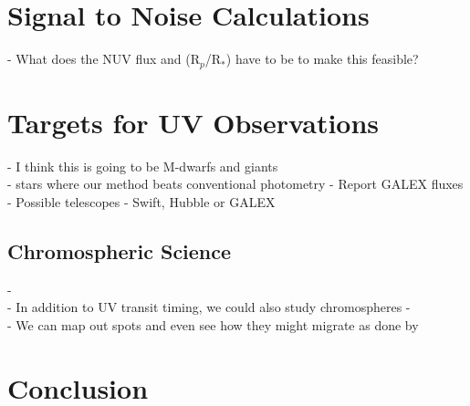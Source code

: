 \documentclass[manuscript]{aastex}
\begin{document}
\section{Signal to Noise Calculations} \label{labl:sn}
- What does the NUV flux and (R$_p$/R$_*$) have to be to make this feasible?

\section{Targets for UV Observations} \label{labl:targ}
- I think this is going to be M-dwarfs and giants \\
- stars where our method beats conventional photometry
-      Report GALEX fluxes \\
-   Possible telescopes - Swift, Hubble or GALEX \\

\subsection{Chromospheric Science} \label{labl:cscience}
- \\
- In addition to UV transit timing, we could also study chromospheres
- \\
- We can map out spots and even see how they might migrate as done by \citet{2010arXiv1002.4113H}

\section{Conclusion}

  
\end{document}
